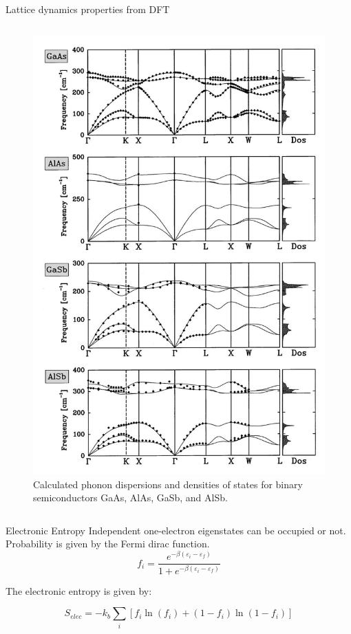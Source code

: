 \documentclass[aspectratio=169]{beamer}
\begin{document}
\begin{frame}{Lattice dynamics properties from DFT}
\begin{columns}
            \begin{figure}
                \centering
                \includegraphics[width=0.45\linewidth]{lectures/figures/10_Phonon_Semiconductors.png}
                \caption{Calculated phonon dispersions and densities of states for binary semiconductors GaAs, AlAs, GaSb, and AlSb.\cite{baroniPhononsRelatedCrystal2001}}

            \end{figure}

        \end{columns}

    \end{frame}

    \begin{frame}{Electronic Entropy}
        Independent one-electron eigenstates can be occupied or not. Probability is given by the Fermi dirac function.
        \begin{equation*}
            f_i = \frac{e^{-\beta(\varepsilon_i-\varepsilon_f)}}{1+e^{-\beta(\varepsilon_i-\varepsilon_f)}}
        \end{equation*}

        The electronic entropy is given by:

        \begin{equation*}
            S_{elec} = -k_b \sum_i \left[ f_i \ln(f_i) + (1-f_i) \ln(1-f_i)\right]
        \end{equation*}
    \end{frame}
\end{document}
